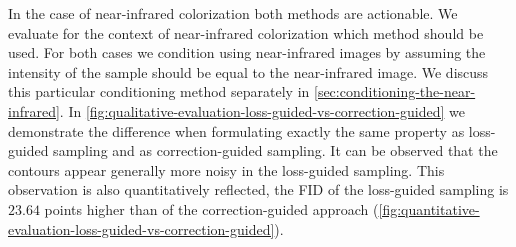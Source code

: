 In the case of near-infrared colorization both methods are actionable.
We evaluate for the context of near-infrared colorization which method should be used.
For both cases we condition using near-infrared images by assuming the intensity of the sample should be equal to the near-infrared image.
We discuss this particular conditioning method separately in \autoref{sec:conditioning-the-near-infrared}.
In \autoref{fig:qualitative-evaluation-loss-guided-vs-correction-guided} we demonstrate the difference when formulating exactly the same property as loss-guided sampling and as correction-guided sampling.
It can be observed that the contours appear generally more noisy in the loss-guided sampling.
This observation is also quantitatively reflected, the FID of the loss-guided sampling is $23.64$ points higher than of the correction-guided approach (\autoref{fig:quantitative-evaluation-loss-guided-vs-correction-guided}).

